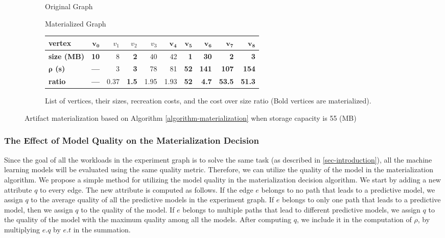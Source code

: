\begin{figure}
\begin{subfigure}{0.5\linewidth}
\centering

\caption{Original Graph}
\label{fig-materialization-example}
\end{subfigure}%
\begin{subfigure}{0.5\linewidth}
\centering

\caption{Materialized Graph}
\label{fig-materialization-example}
\end{subfigure}
\begin{subfigure}{\linewidth}
\setlength\tabcolsep{3.5pt} %
\begin{tabular}{l | | >{\bfseries}r | r  |>{\bfseries}r | r | r | >{\bfseries}r | >{\bfseries}r | >{\bfseries}r |>{\bfseries}r }
\hline
\textbf{vertex} & $\boldsymbol{v_0}$ & $v_1$ & $v_2$ & $v_3$ & $\boldsymbol{v_4}$ & $\boldsymbol{v_5}$ & $\boldsymbol{v_6}$ & $\boldsymbol{v_7}$ &$\boldsymbol{v_8}$ \\
\hline
\textbf{size (MB)}    & 10 & 8 & 2 & 40 & 42 & 1 & 30 & 2   & 3        \\
\textbf{$\boldsymbol{\rho}$ (s)} & ---   & 3 & 3 & 78 & 81 & 52 & 141 & 107 & 154	  \\
\textbf{ratio}& ---   & 0.37 & 1.5 & 1.95 & 1.93 & 52 & 4.7 & 53.5 & 51.3	\\
\hline
\end{tabular}
\caption{List of vertices, their sizes, recreation costs, and the cost over size ratio (Bold vertices are materialized).}
\end{subfigure}
\caption{Artifact materialization based on Algorithm \ref{algorithm-materialization} when storage capacity is 55 (MB)}
\end{figure}

\subsubsection{The Effect of Model Quality on the Materialization Decision}
Since the goal of all the workloads in the experiment graph is to solve the same task (as described in \ref{sec-introduction}), all the machine learning models will be evaluated using the same quality metric.
Therefore, we can utilize the quality of the model in the materialization algorithm.
We propose a simple method for utilizing the model quality in the materialization decision algorithm.
We start by adding a new attribute $q$ to every edge.
The new attribute is computed as follows.
If the edge $e$ belongs to no path that leads to a predictive model, we assign $q$ to the average quality of all the predictive models in the experiment graph.
If $e$ belongs to only one path that leads to a predictive model, then we assign $q$ to the quality of the model.
If $e$ belongs to multiple paths that lead to different predictive models, we assign $q$ to the quality of the model with the maximum quality among all the models.
After computing $q$, we include it in the computation of $\rho$, by multiplying $e.q$ by $e.t$ in the summation. 

